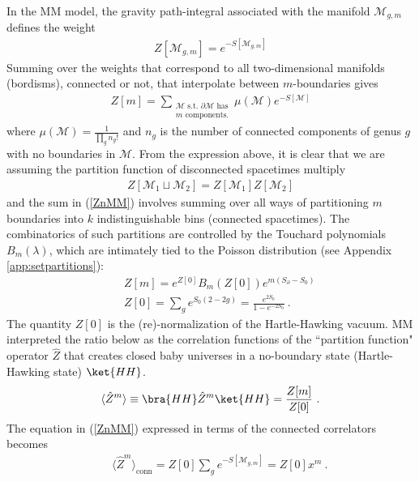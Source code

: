 \documentclass[a4paper,11pt]{article}
\theoremstyle{definition}
\numberwithin{equation}{section}
\newcommand{\p}{\partial}
\newcommand{\nn}{\nonumber}
\begin{document}
In the MM model, the gravity path-integral associated with the manifold $\mathcal{M}_{g,m}$ defines the weight
\begin{eqnarray}
    Z[\mathcal{M}_{g,m}]=e^{-S[\mathcal{M}_{g,m}]}
\end{eqnarray}
Summing over the weights that correspond to all two-dimensional manifolds (bordisms), connected or not, that interpolate between $m$-boundaries gives 
\begin{eqnarray}\label{ZnMM}
    Z[m]=\sum_{\substack{\text{$\mathcal{M}$ s.t. $\p\mathcal{M}$ has}\\
     \text{$m$ components.}}}\mu(\mathcal{M})e^{-S[\mathcal{M}]}
\end{eqnarray}
where $\mu(\mathcal{M})=\frac{1}{\prod_g n_g!}$ and $n_g$ is the number of connected components of genus $g$ with no boundaries in $\mathcal{M}$. From the expression above, it is clear that we are assuming the partition function of disconnected spacetimes multiply 
\begin{eqnarray}
    Z[\mathcal{M}_1\sqcup \mathcal{M}_2]=Z[\mathcal{M}_1]Z[\mathcal{M}_2]
\end{eqnarray}
and the sum in (\ref{ZnMM}) involves summing over all ways of partitioning $m$ boundaries into $k$ indistinguishable bins (connected spacetimes). The combinatorics of such partitions are controlled by the Touchard polynomials $B_m(\lambda)$, which are intimately tied to the Poisson distribution (see Appendix \ref{app:setpartitions}):
\begin{eqnarray}
    &&Z[m]=e^{Z[0]} B_m(Z[0]) e^{m(S_\p-S_0)}\nn\\
 &&Z[0]=\sum_ge^{S_0(2-2g)}=\frac{e^{2S_0}}{1-e^{-2S_0}}\ .
\end{eqnarray}
The quantity $Z[0]$ is the (re)-normalization of the Hartle-Hawking vacuum. MM interpreted the ratio below as the correlation functions of the ``partition function" operator $\hat{Z}$ that creates closed baby universes in a no-boundary state (Hartle-Hawking state) $\ket{HH}$.
\begin{eqnarray}
    \langle\hat{Z}^m\rangle\equiv \bra{HH}\hat{Z}^m\ket{HH}=\frac{Z[m]}{Z[0]}\ .
\end{eqnarray}
The equation in (\ref{ZnMM})  expressed in terms of the connected correlators becomes
\begin{eqnarray}\label{ZconMM}
  && \langle\hat{Z}^m\rangle_\text{conn}=Z[0] \sum_g e^{-S[\mathcal{M}_{g,m}]}=Z[0]x^m\ .
\end{eqnarray}
\end{document}
